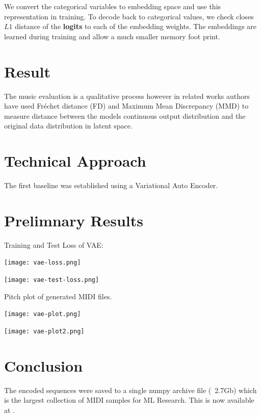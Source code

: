 \documentclass{article}
\begin{document}
We convert the categorical variables to embedding space and use this representation in training. To decode back to categorical values, we check closes $L1$ distance of the \textbf{logits} to each of the embedding weights. The embeddings are learned during training and allow a much smaller memory foot print.

\section{Result}

The music evaluation is a qualitative process however in related works authors have used Fréchet distance (FD) \cite{heusel2018gans} and Maximum Mean Discrepancy (MMD) \cite{gretton12} to measure distance between the models continuous output distribution and the original data distribution in latent space.

\section{Technical Approach}

The first baseline was established using a Variational Auto Encoder.

\section{Prelimnary Results}


Training and Test Loss of VAE:

\texttt{[image: vae-loss.png]}

\texttt{[image: vae-test-loss.png]}

Pitch plot of generated MIDI files. 

\texttt{[image: vae-plot.png]}

\texttt{[image: vae-plot2.png]}

\section{Conclusion}

The encoded sequences were saved to a single numpy archive file (~2.7Gb) which is the largest collection of MIDI samples for ML Research. This is now available at \citep{midi_note_seq_data_set}.




\end{document}
